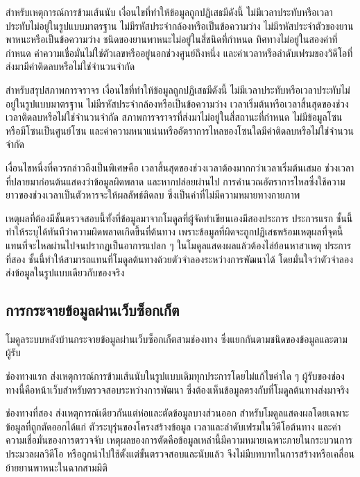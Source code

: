 สำหรับเหตุการณ์การข้ามเส้นนับ เงื่อนไขที่ทำให้ข้อมูลถูกปฏิเสธมีดังนี้ ไม่มีเวลาประทับหรือเวลาประทับไม่อยู่ในรูปแบบมาตรฐาน ไม่มีรหัสประจำกล้องหรือเป็นข้อความว่าง ไม่มีรหัสประจำตัวของยานพาหนะหรือเป็นข้อความว่าง ชนิดของยานพาหนะไม่อยู่ในสี่ชนิดที่กำหนด ทิศทางไม่อยู่ในสองค่าที่กำหนด ค่าความเชื่อมั่นไม่ใช่ตัวเลขหรืออยู่นอกช่วงศูนย์ถึงหนึ่ง และค่าเวลาหรือลำดับเฟรมของวิดีโอที่ส่งมามีค่าติดลบหรือไม่ใช่จำนวนจำกัด

สำหรับสรุปสภาพการจราจร เงื่อนไขที่ทำให้ข้อมูลถูกปฏิเสธมีดังนี้ ไม่มีเวลาประทับหรือเวลาประทับไม่อยู่ในรูปแบบมาตรฐาน ไม่มีรหัสประจำกล้องหรือเป็นข้อความว่าง เวลาเริ่มต้นหรือเวลาสิ้นสุดของช่วงเวลาติดลบหรือไม่ใช่จำนวนจำกัด สภาพการจราจรที่ส่งมาไม่อยู่ในสี่สถานะที่กำหนด ไม่มีข้อมูลโซนหรือมีโซนเป็นศูนย์โซน และค่าความหนาแน่นหรืออัตราการไหลของโซนใดมีค่าติดลบหรือไม่ใช่จำนวนจำกัด

เงื่อนไขหนึ่งที่ควรกล่าวถึงเป็นพิเศษคือ เวลาสิ้นสุดของช่วงเวลาต้องมากกว่าเวลาเริ่มต้นเสมอ ช่วงเวลาที่ปลายมาก่อนต้นแสดงว่าข้อมูลผิดพลาด และหากปล่อยผ่านไป การคำนวณอัตราการไหลซึ่งใช้ความยาวของช่วงเวลาเป็นตัวหารจะให้ผลลัพธ์ติดลบ ซึ่งเป็นค่าที่ไม่มีความหมายทางกายภาพ

เหตุผลที่ต้องมีชั้นตรวจสอบนี้ทั้งที่ข้อมูลมาจากโมดูลที่ผู้จัดทำเขียนเองมีสองประการ ประการแรก ชั้นนี้ทำให้ระบุได้ทันทีว่าความผิดพลาดเกิดขึ้นที่ต้นทาง เพราะข้อมูลที่ผิดจะถูกปฏิเสธพร้อมเหตุผลที่จุดนี้ แทนที่จะไหลผ่านไปจนปรากฏเป็นอาการแปลก ๆ ในโมดูลแสดงผลแล้วต้องไล่ย้อนหาสาเหตุ ประการที่สอง ชั้นนี้ทำให้สามารถแทนที่โมดูลต้นทางด้วยตัวจำลองระหว่างการพัฒนาได้ โดยมั่นใจว่าตัวจำลองส่งข้อมูลในรูปแบบเดียวกับของจริง

\subsection{การกระจายข้อมูลผ่านเว็บซ็อกเก็ต}
\label{subsec:broadcast}

โมดูลระบบหลังบ้านกระจายข้อมูลผ่านเว็บซ็อกเก็ตสามช่องทาง ซึ่งแยกกันตามชนิดของข้อมูลและตามผู้รับ

ช่องทางแรก ส่งเหตุการณ์การข้ามเส้นนับในรูปแบบเดิมทุกประการโดยไม่แก้ไขค่าใด ๆ ผู้รับของช่องทางนี้คือหน้าเว็บสำหรับตรวจสอบระหว่างการพัฒนา ซึ่งต้องเห็นข้อมูลตรงกับที่โมดูลต้นทางส่งมาจริง

ช่องทางที่สอง ส่งเหตุการณ์เดียวกันแต่ห่อและตัดข้อมูลบางส่วนออก สำหรับโมดูลแสดงผลโดยเฉพาะ ข้อมูลที่ถูกตัดออกได้แก่ ตัวระบุรุ่นของโครงสร้างข้อมูล เวลาและลำดับเฟรมในวิดีโอต้นทาง และค่าความเชื่อมั่นของการตรวจจับ  เหตุผลของการตัดคือข้อมูลเหล่านี้มีความหมายเฉพาะภายในกระบวนการประมวลผลวิดีโอ หรือถูกนำไปใช้ตั้งแต่ขั้นตรวจสอบและนับแล้ว จึงไม่มีบทบาทในการสร้างหรือเคลื่อนย้ายยานพาหนะในฉากสามมิติ

